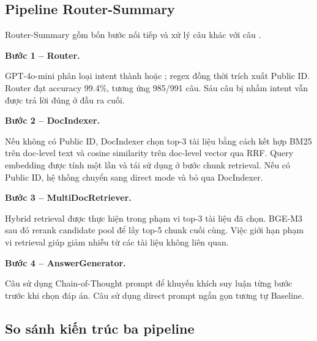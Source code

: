 \documentclass[../DoAn.tex]{subfiles}
\begin{document}
\subsection{Pipeline Router-Summary}
\label{subsection:3.3.3}

Router-Summary gồm bốn bước nối tiếp và xử lý câu  khác với câu .

\noindent\textbf{Bước 1 -- Router.}

GPT-4o-mini phân loại intent thành  hoặc ; regex đồng thời trích xuất Public ID. Router đạt accuracy 99.4\%, tương ứng 985/991 câu. Sáu câu bị nhầm intent vẫn được trả lời đúng ở đầu ra cuối.

\noindent\textbf{Bước 2 -- DocIndexer.}

Nếu không có Public ID, DocIndexer chọn top-3 tài liệu bằng cách kết hợp BM25 trên doc-level text và cosine similarity trên doc-level vector qua RRF. Query embedding được tính một lần và tái sử dụng ở bước chunk retrieval. Nếu có Public ID, hệ thống chuyển sang direct mode và bỏ qua DocIndexer.

\noindent\textbf{Bước 3 -- MultiDocRetriever.}

Hybrid retrieval được thực hiện trong phạm vi top-3 tài liệu đã chọn. BGE-M3 sau đó rerank candidate pool để lấy top-5 chunk cuối cùng. Việc giới hạn phạm vi retrieval giúp giảm nhiễu từ các tài liệu không liên quan.

\noindent\textbf{Bước 4 -- AnswerGenerator.}

Câu  sử dụng Chain-of-Thought prompt để khuyến khích suy luận từng bước trước khi chọn đáp án. Câu  sử dụng direct prompt ngắn gọn tương tự Baseline.

\subsection{So sánh kiến trúc ba pipeline}
\label{subsection:3.3.4}
\end{document}
